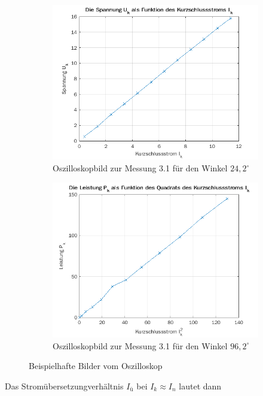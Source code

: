 \documentclass{article}
\begin{document}
\begin{figure}[h]
  \centering
  \begin{subfigure}{.45\textwidth}
    \centering
    \includegraphics[width=\linewidth]{../assets/images/gep3/ik_uk.png}
    \caption{Oszilloskopbild zur Messung 3.1 für den Winkel $24,2^{\circ}$}
  \end{subfigure}
  \begin{subfigure}{.45\textwidth}
    \centering
    \includegraphics[width=\linewidth]{../assets/images/gep3/ik_pk.png}
    \caption{Oszilloskopbild zur Messung 3.1 für den Winkel $96,2^{\circ}$}
  \end{subfigure}
  \label{fig:31_242}
  \caption{Beispielhafte Bilder vom Oszilloskop}
\end{figure}
Das Stromübersetzungverhältnis $I_{ü}$ bei $I_{k} \approx I_{n}$ lautet dann
\end{document}
